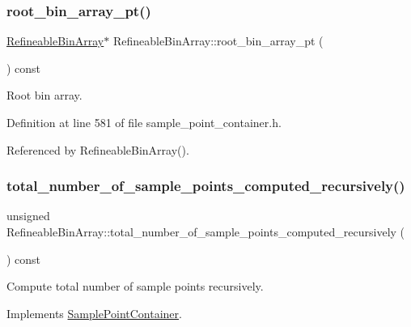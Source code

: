 \subsubsection{\texorpdfstring{root\+\_\+bin\+\_\+array\+\_\+pt()}{root\_bin\_array\_pt()}}
{\footnotesize\ttfamily \hyperlink{classRefineableBinArray}{Refineable\+Bin\+Array}$\ast$ Refineable\+Bin\+Array\+::root\+\_\+bin\+\_\+array\+\_\+pt (\begin{DoxyParamCaption}{ }\end{DoxyParamCaption}) const\hspace{0.3cm}{\ttfamily [inline]}}



Root bin array. 



Definition at line 581 of file sample\+\_\+point\+\_\+container.\+h.



Referenced by Refineable\+Bin\+Array().

\mbox{\label{classRefineableBinArray_a267d58bd06dafc53aff7b42927500a8b}} 
\subsubsection{\texorpdfstring{total\+\_\+number\+\_\+of\+\_\+sample\+\_\+points\+\_\+computed\+\_\+recursively()}{total\_number\_of\_sample\_points\_computed\_recursively()}}
{\footnotesize\ttfamily unsigned Refineable\+Bin\+Array\+::total\+\_\+number\+\_\+of\+\_\+sample\+\_\+points\+\_\+computed\+\_\+recursively (\begin{DoxyParamCaption}{ }\end{DoxyParamCaption}) const\hspace{0.3cm}{\ttfamily [virtual]}}



Compute total number of sample points recursively. 



Implements \hyperlink{classSamplePointContainer_ac7bf51a6987a9180c7715d6211fdbb46}{Sample\+Point\+Container}.



